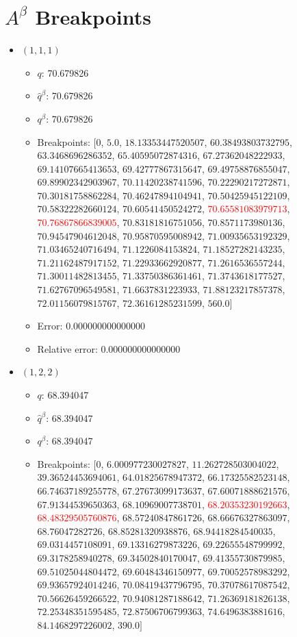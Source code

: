 \documentclass{article}%
\begin{document}
\section{$A^\beta$ Breakpoints}%
\thispagestyle{plain}%
\begin{itemize}%
	\item $(1, 1, 1)$%
	\begin{itemize}%
		\item $q$: 70.679826%
		\item $\hat{q}^\beta$: 70.679826%
		\item $q^\beta$: 70.679826%
		\item Breakpoints: $[$$0$, $5.0$, $18.13353447520507$, $60.38493803732795$, $63.3468696286352$, $65.40595072874316$, $67.27362048222933$, $69.14107665413653$, $69.42777867315647$, $69.49758876855047$, $69.89902342903967$, $70.11420238741596$, $70.22290217272871$, $70.30181758862284$, $70.46247894104941$, $70.50425945122109$, $70.58322282660124$, $70.60541450524272$, \textcolor{red}{$70.65581083979713$}, \textcolor{red}{$70.76867866839005$}, $70.83181816751056$, $70.8571173980136$, $70.94547904612048$, $70.95870595008942$, $71.00935653192329$, $71.03465240716494$, $71.1226084153824$, $71.18527282143235$, $71.21162487917152$, $71.22933662920877$, $71.2616536557244$, $71.30011482813455$, $71.33750386361461$, $71.3743618177527$, $71.62767096549581$, $71.6637831223933$, $71.88123217857378$, $72.01156079815767$, $72.36161285231599$, $560.0$$]$%
		\item Error: 0.000000000000000%
		\item Relative error: 0.000000000000000%
	\end{itemize}%
	\item $(1, 2, 2)$%
	\begin{itemize}%
		\item $q$: 68.394047%
		\item $\hat{q}^\beta$: 68.394047%
		\item $q^\beta$: 68.394047%
		\item Breakpoints: $[$$0$, $6.000977230027827$, $11.262728503004022$, $39.36524453694061$, $64.01825678947372$, $66.17325582523148$, $66.74637189255778$, $67.27673099173637$, $67.60071888621576$, $67.91344539650363$, $68.10969007738701$, \textcolor{red}{$68.20353230192663$}, \textcolor{red}{$68.48329505760876$}, $68.57240847861726$, $68.66676327863097$, $68.76047282726$, $68.85281320938876$, $68.94418284540035$, $69.0314457108091$, $69.13316279873226$, $69.22655548799992$, $69.3178258940278$, $69.34502840170047$, $69.41355730879985$, $69.51025044804472$, $69.60484346150977$, $69.70052578983292$, $69.93657924014246$, $70.08419437796795$, $70.37078617087542$, $70.56626459266522$, $70.94081287188642$, $71.26369181826138$, $72.25348351595485$, $72.87506706799363$, $74.6496383881616$, $84.1468297226002$, $390.0$$]$%

\end{itemize}
\end{itemize}
\end{document}
